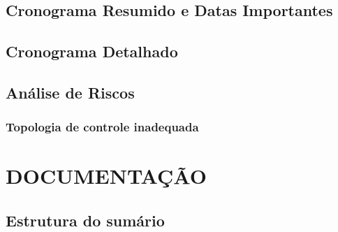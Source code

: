 \documentclass[a4paper]{article}
\begin{document}
\subsection{Cronograma Resumido e Datas Importantes}

\subsection{Cronograma Detalhado}

\subsection{Análise de Riscos}

\subsubsection{Topologia de controle inadequada}

\section{DOCUMENTAÇÃO}

\subsection{Estrutura do sumário}

\nocite {Knuth92,ConcreteMath,Simpson,Er01}



\end{document}
